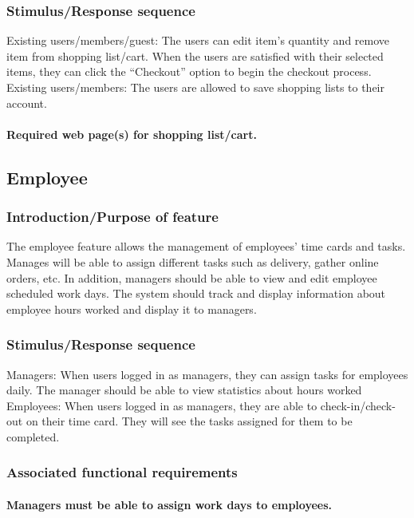 \documentclass{scrreprt}
\theoremstyle{funreq}
\begin{document}
\subsubsection{Stimulus/Response sequence}
Existing users/members/guest:
The users can edit item’s quantity and remove item from shopping list/cart. When the users are satisfied with their selected items, they can click the “Checkout” option to begin the checkout process. 
Existing users/members:
The users are allowed to save shopping lists to their account.

\paragraph[]{\normalfont Required web page(s) for shopping list/cart.}


\subsection{Employee}
\subsubsection{Introduction/Purpose of feature}
The employee feature allows the management of employees’ time cards and tasks. Manages will be able to assign different tasks such as delivery, gather online orders, etc.  In addition, managers should be able to view and edit employee scheduled work days.  The system should track and display information about employee hours worked and display it to managers.


\subsubsection{Stimulus/Response sequence}
Managers:
When users logged in as managers, they can assign tasks for employees daily.  The manager should be able to view statistics about hours worked
Employees:
When users logged in as managers, they are able to check-in/check-out on their time card. They will see the tasks assigned for them to be completed.

\subsubsection{Associated functional requirements}
\paragraph[]{\normalfont Managers must be able to assign work days to employees.}
\end{document}
